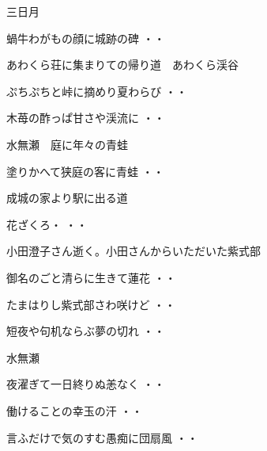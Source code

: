 \vspace{0.6cm}
三日月
\begin{shiika}蝸牛わがもの顔に城跡の碑
\hfill{・・}\end{shiika}
\vspace{0.6cm}
あわくら荘に集まりての帰り道　あわくら渓谷
\begin{shiika}ぷちぷちと峠に摘めり夏わらび
\hfill{・・}\end{shiika}
\begin{shiika}木苺の酢っぱ甘さや渓流に
\hfill{・・}\end{shiika}
\vspace{0.6cm}
水無瀬　庭に年々の青蛙
\begin{shiika}塗りかへて狭庭の客に青蛙
\hfill{・・}\end{shiika}
\vspace{0.6cm}
成城の家より駅に出る道
\begin{shiika}花ざくろ・
\hfill{・・}\end{shiika}
\vspace{0.6cm}
小田澄子さん逝く。小田さんからいただいた紫式部
\begin{shiika}御名のごと清らに生きて蓮花
\hfill{・・}\end{shiika}
\begin{shiika}たまはりし紫式部さわ咲けど
\hfill{・・}\end{shiika}
\begin{shiika}短夜や句机ならぶ夢の切れ
\hfill{・・}\end{shiika}
\vspace{0.6cm}
水無瀬
\begin{shiika}夜濯ぎて一日終りぬ恙なく
\hfill{・・}\end{shiika}
\vspace{0.6cm}
\begin{shiika}働けることの幸玉の汗
\hfill{・・}\end{shiika}
\vspace{0.6cm}
\begin{shiika}言ふだけで気のすむ愚痴に団扇風
\hfill{・・}\end{shiika}
\vspace{0.6cm}
